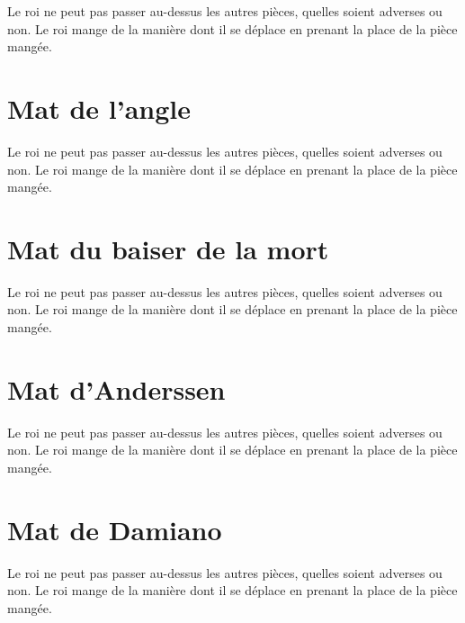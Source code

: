 \documentclass[a5paper,openany,twocolumn]{book}
\begin{document}
{Le roi ne peut pas passer au-dessus les autres pièces, quelles soient adverses ou non. Le roi mange de la manière dont il se déplace en prenant la place de la pièce mangée. 


\chapter{Mat de l'angle}

Le roi ne peut pas passer au-dessus les autres pièces, quelles soient adverses ou non. Le roi mange de la manière dont il se déplace en prenant la place de la pièce mangée. 


\chapter{Mat du baiser de la mort}

Le roi ne peut pas passer au-dessus les autres pièces, quelles soient adverses ou non. Le roi mange de la manière dont il se déplace en prenant la place de la pièce mangée. 


\chapter{Mat d'Anderssen}
 
Le roi ne peut pas passer au-dessus les autres pièces, quelles soient adverses ou non. Le roi mange de la manière dont il se déplace en prenant la place de la pièce mangée. 


\chapter{Mat de Damiano}
 
Le roi ne peut pas passer au-dessus les autres pièces, quelles soient adverses ou non. Le roi mange de la manière dont il se déplace en prenant la place de la pièce mangée. 

}
\end{document}
